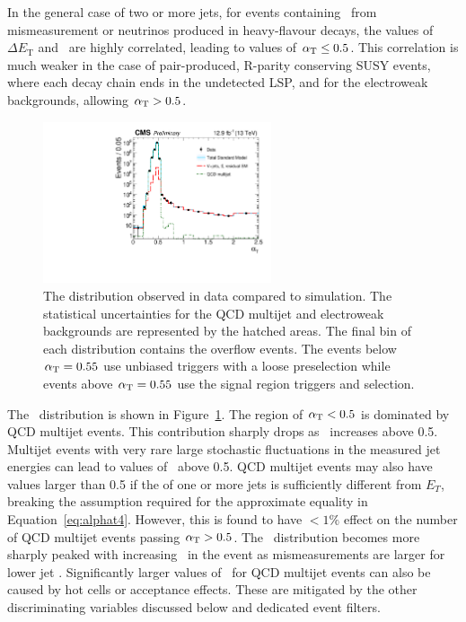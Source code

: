In the general case of two or more jets, for events containing \met~from mismeasurement or 
neutrinos produced in heavy-flavour decays, the values of $\Delta E_{\textrm{T}}$ and \mht~are highly correlated, leading
to values of $\alpha_{\text{T}} \le 0.5$. This correlation is much weaker in the case of pair-produced, 
R-parity conserving SUSY events, where each decay chain ends in the 
undetected LSP, and for the electroweak backgrounds, allowing $\alpha_{\text{T}} > 0.5$.

\begin{figure}[!htb]
  \centering
    \includegraphics[width=0.6\textwidth]{./Figures/alphat/alphat_data.pdf}
  \caption{
    The \alphat distribution observed in data compared to simulation. 
    The statistical uncertainties for the QCD multijet and electroweak backgrounds are represented by the hatched areas. 
    The final bin of each distribution contains the overflow events. The events below $\alpha_{\text{T}}= 0.55$ use unbiased triggers with
    a loose preselection while events above $\alpha_{\text{T}} = 0.55$ use the signal region triggers and selection.
    }
  \label{fig:alphat-data}
\end{figure}

The \alphat~distribution is shown in Figure~\ref{fig:alphat-data}. The region of $\alpha_{\text{T}} < 0.5$ is dominated by
QCD multijet events. This contribution sharply drops as \alphat~increases above 0.5. Multijet events with
very rare large stochastic fluctuations in the measured jet energies can lead
to values of \alphat~above 0.5. QCD multijet events may also have \alphat values larger than 0.5 if the 
\pt of one or more jets is sufficiently different from $E_T$, breaking the assumption required for the approximate equality in Equation~\ref{eq:alphat4}. However, this is found to have $< 1\%$ effect on the number of QCD multijet events passing $\alpha_{\text{T}} > 0.5$.
The \alphat~distribution becomes more sharply peaked with increasing \scalht~in the event as mismeasurements are larger
 for lower jet \pt. Significantly larger values of \alphat~for QCD multijet events can also be caused by 
hot cells or acceptance effects. These are mitigated by the other discriminating variables 
discussed below and dedicated event filters. 

